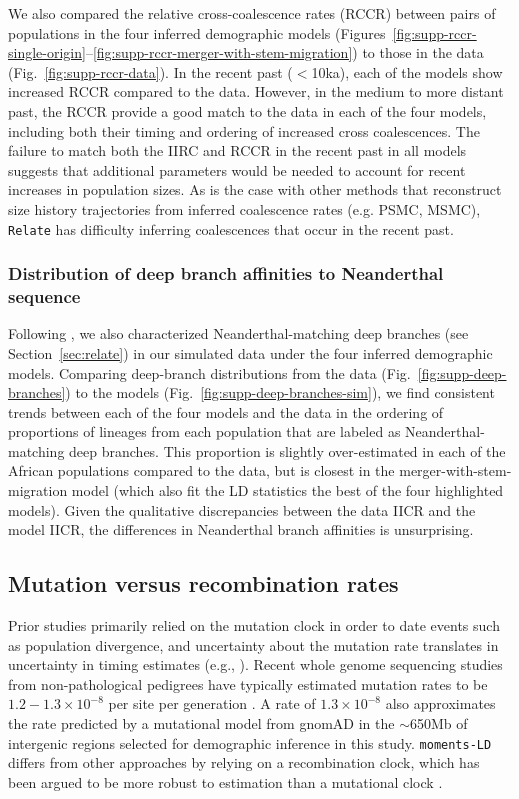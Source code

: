 \documentclass[]{article}
\newcommand{\Relate}{\texttt{Relate}\xspace}
\begin{document}
We also compared the relative cross-coalescence rates (RCCR) between pairs of
populations in the four inferred demographic models
(Figures~\ref{fig:supp-rccr-single-origin}--\ref{fig:supp-rccr-merger-with-stem-migration})
to those in the data (Fig.~\ref{fig:supp-rccr-data}). In the recent past
($<$10ka), each of the models show increased RCCR compared to the data.
However, in the medium to more distant past, the RCCR provide a good match to
the data in each of the four models, including both their timing and ordering
of increased cross coalescences. The failure to match both the IIRC and RCCR in
the recent past in all models suggests that additional parameters would be
needed to account for recent increases in population sizes. As is the case with
other methods that reconstruct size history trajectories from inferred coalescence
rates (e.g. PSMC, MSMC), \Relate has difficulty inferring coalescences that
occur in the recent past.

\subsubsection{Distribution of deep branch affinities to Neanderthal sequence}

Following \citet{Speidel2019-nj}, we also characterized Neanderthal-matching
deep branches (see Section~\ref{sec:relate}) in our simulated data under the
four inferred demographic models. Comparing deep-branch distributions from the
data (Fig.~\ref{fig:supp-deep-branches}) to the models
(Fig.~\ref{fig:supp-deep-branches-sim}), we find consistent trends between each
of the four models and the data in the ordering of proportions of lineages from
each population that are labeled as Neanderthal-matching deep branches. This
proportion is slightly over-estimated in each of the African populations
compared to the data, but is closest in the merger-with-stem-migration model
(which also fit the LD statistics the best of the four highlighted models).
Given the qualitative discrepancies between the data IICR and the model IICR,
the differences in Neanderthal branch affinities is unsurprising.

\subsection{Mutation versus recombination rates}
\label{sec:supp-mutation}

Prior studies primarily relied on the mutation clock in order to date events
such as population divergence, and uncertainty about the mutation rate
translates in uncertainty in timing estimates (e.g., \citet{Moorjani2016-qj}).
Recent whole genome sequencing studies from non-pathological pedigrees have
typically estimated mutation rates to be $1.2-1.3\times10^{-8}$ per site per
generation \citep{Sasani2019-zp,Tian2019-zv}. A rate of $1.3\times10^{-8}$ also
approximates the rate predicted by a mutational model from gnomAD
\citep{Karczewski2020-le} in the $\sim$650Mb of intergenic regions selected for
demographic inference in this study.
\texttt{moments-LD} differs from other approaches by
relying on a recombination clock, which has been argued to be more robust to
estimation than a mutational clock \citep{Moorjani2016-ur}.
\end{document}
